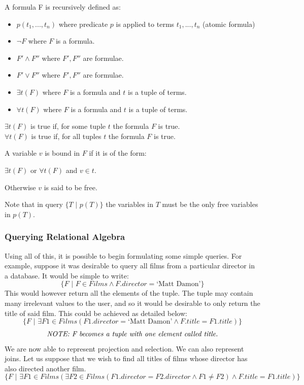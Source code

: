 \documentclass[a4paper, 11pt]{article}
\begin{document}
      A formula F is recursively defined as:
      \begin{itemize}
        \item $p(t_1, ..., t_n)$ where predicate $p$ is applied to terms $t_1, ..., t_n$ (atomic formula)
        \item $\lnot F$ where $F$ is a formula.
        \item $F' \land F''$ where $F', F''$ are formulae.
        \item $F' \lor F''$ where $F', F''$ are formulae.
        \item $\exists t(F)$ where $F$ is a formula and $t$ is a tuple of terms.
        \item $\forall t(F)$ where $F$ is a formula and $t$ is a tuple of terms.
      \end{itemize}

      $\exists t(F)$ is true if, for some tuple $t$ the formula $F$ is true. \\
      $\forall t(F)$ is true if, for all tuples $t$ the formula $F$ is true.

      A variable $v$ is bound in $F$ if it is of the form:

      $\exists t(F)$ or $\forall t(F)$ and $v \in t$.

      Otherwise $v$ is said to be free.

      Note that in query $\{T\text{ | }p(T)\}$ the variables in $T$ must be the only
      free variables in $p(T)$.

    \subsubsection{Querying Relational Algebra}
      Using all of this, it is possible to begin formulating some simple
      queries. For example, suppose it was desirable to query all films from a
      particular director in a database. It would be simple to write:
      $$ \{F\text{ | }F \in Films \land F.director = \text{`Matt Damon'}\} $$
      This would however return all the elements of the tuple. The tuple may
      contain many irrelevant values to the user, and so it would be desirable
      to only return the title of said film. This could be achieved as detailed
      below:
      $$ \{F\text{ | } \exists F1 \in Films(F1.director = \text{`Matt Damon'}
           \land F.title = F1.title)\} $$
      $$ \emph{NOTE: F becomes a tuple with one element called title.} $$
      We are now able to represent projection and selection. We can also
      represent joins. Let us suppose that we wish to find all titles of films
      whose director has also directed another film.
      $$ \{F\text{ | }\exists F1 \in Films(\exists F2 \in Films(F1.director =
           F2.director \land F1 \neq F2) \land F.title = F1.title)\} $$
\end{document}
